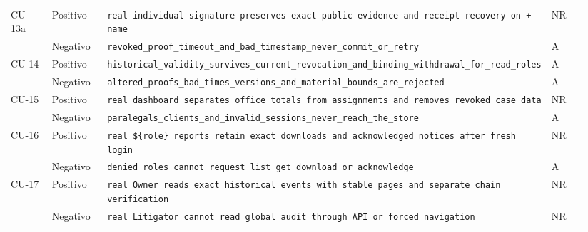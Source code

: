 \begin{longtable}{@{}L{0.08\linewidth} L{0.10\linewidth} L{0.69\linewidth} C{0.07\linewidth}@{}}
  \addlinespace
  CU-13a & Positivo & \newline \texttt{\textquotesingle{}real individual signature preserves exact public evidence and receipt recovery on \textquotesingle{} + name} & NR \\*
   & Negativo & \newline \texttt{revoked\_proof\_timeout\_and\_bad\_timestamp\_never\_commit\_or\_retry} & A \\
  \addlinespace
  CU-14 & Positivo & \newline \texttt{historical\_validity\_survives\_current\_revocation\_and\_binding\_withdrawal\_for\_read\_roles} & A \\*
   & Negativo & \newline \texttt{altered\_proofs\_bad\_times\_versions\_and\_material\_bounds\_are\_rejected} & A \\
  \addlinespace
  CU-15 & Positivo & \newline \texttt{real dashboard separates office totals from assignments and removes revoked case data} & NR \\*
   & Negativo & \newline \texttt{paralegals\_clients\_and\_invalid\_sessions\_never\_reach\_the\_store} & A \\
  \addlinespace
  CU-16 & Positivo & \newline \texttt{real \$\{role\} reports retain exact downloads and acknowledged notices after fresh login} & NR \\*
   & Negativo & \newline \texttt{denied\_roles\_cannot\_request\_list\_get\_download\_or\_acknowledge} & A \\
  \addlinespace
  CU-17 & Positivo & \newline \texttt{real Owner reads exact historical events with stable pages and separate chain verification} & NR \\*
   & Negativo & \newline \texttt{real Litigator cannot read global audit through API or forced navigation} & NR \\

\end{longtable}

